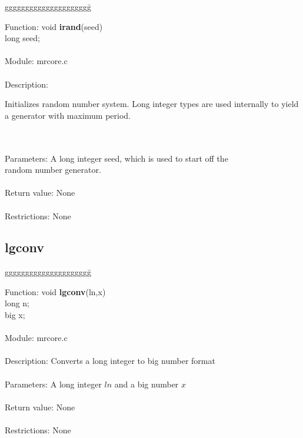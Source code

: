 \begin{tabbing}
ggggggggggggggggggggg\= \kill


      Function:      \>void {\bf irand}(seed) \\
                     \>long seed; \\
      \ \\
      Module:        \>mrcore.c \\
      \ \\
      Description:   \>
                     \parbox[t]{3in}
                     {Initializes random number system. 
                     Long integer types are used internally to yield a
                     generator with maximum period.} \\
      \ \\
      Parameters:    \>A long integer seed, which is used to start off the \\
                     \>random number generator. \\
      \ \\
      Return value:  \>None \\
      \ \\
      Restrictions:  \>None \\

\end{tabbing}

\subsection{lgconv}

\begin{tabbing}
ggggggggggggggggggggg\= \kill

      Function:      \>void {\bf lgconv}(ln,x) \\
                     \>long n; \\
                     \>big x; \\
      \ \\
      Module:        \>mrcore.c \\
      \ \\
      Description:   \>Converts a long integer to big number format \\
      \ \\
      Parameters:    \>A long integer $ln$ and a big number $x$  \\
      \ \\
      Return value:  \>None \\
      \ \\
      Restrictions:  \>None \\

\end{tabbing}
\pagebreak

